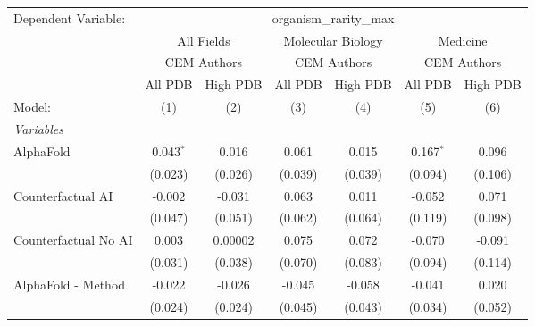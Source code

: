 \begingroup
\centering
\begin{tabular}{lcccccc}
   \tabularnewline \midrule \midrule
   Dependent Variable: & \multicolumn{6}{c}{organism\_rarity\_max}\\
 & \multicolumn{2}{c}{All Fields} & \multicolumn{2}{c}{Molecular Biology} & \multicolumn{2}{c}{Medicine} \\
\cmidrule(lr){2-3} \cmidrule(lr){4-5} \cmidrule(lr){6-7}
 & \multicolumn{2}{c}{CEM Authors} & \multicolumn{2}{c}{CEM Authors} & \multicolumn{2}{c}{CEM Authors} \\
\cmidrule(lr){2-3} \cmidrule(lr){4-5} \cmidrule(lr){6-7}
 & \multicolumn{1}{c}{All PDB} & \multicolumn{1}{c}{High PDB} & \multicolumn{1}{c}{All PDB} & \multicolumn{1}{c}{High PDB} & \multicolumn{1}{c}{All PDB} & \multicolumn{1}{c}{High PDB} \\
\cmidrule(lr){2-2} \cmidrule(lr){3-3} \cmidrule(lr){4-4} \cmidrule(lr){5-5} \cmidrule(lr){6-6} \cmidrule(lr){7-7}
   Model:                                                     & (1)         & (2)     & (3)     & (4)          & (5)         & (6)\\  
   \midrule
   \emph{Variables}\\
   AlphaFold                                                  & 0.043$^{*}$ & 0.016   & 0.061   & 0.015        & 0.167$^{*}$ & 0.096\\   
                                                              & (0.023)     & (0.026) & (0.039) & (0.039)      & (0.094)     & (0.106)\\   
   Counterfactual AI                                          & -0.002      & -0.031  & 0.063   & 0.011        & -0.052      & 0.071\\   
                                                              & (0.047)     & (0.051) & (0.062) & (0.064)      & (0.119)     & (0.098)\\   
   Counterfactual No AI                                       & 0.003       & 0.00002 & 0.075   & 0.072        & -0.070      & -0.091\\   
                                                              & (0.031)     & (0.038) & (0.070) & (0.083)      & (0.094)     & (0.114)\\   
   AlphaFold - Method                                         & -0.022      & -0.026  & -0.045  & -0.058       & -0.041      & 0.020\\   
                                                              & (0.024)     & (0.024) & (0.045) & (0.043)      & (0.034)     & (0.052)\\   

\end{tabular}
